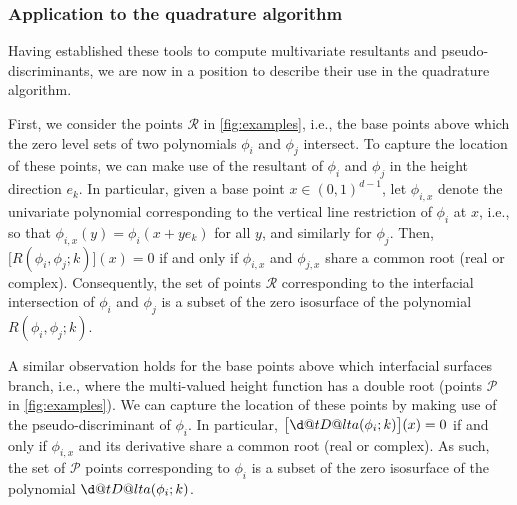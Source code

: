 \documentclass[onefignum,onetabnum,onealgnum,oneeqnum]{siamart190516}
\makeatletter
\newcommand{\dotDelta}{{\vphantom{\Delta}\mathpalette\d@tD@lta\relax}}
\newcommand{\d@tD@lta}[2]{\ooalign{\hidewidth$\m@th#1\mkern-1mu\cdot$\hidewidth\cr$\m@th#1\Delta$\cr}}
\makeatother
\begin{document}







\subsubsection{Application to the quadrature algorithm} \label{sec:spurious} Having established these tools to compute multivariate resultants and pseudo-discriminants, we are now in a position to describe their use in the quadrature algorithm. 

First, we consider the points $\mathcal R$ in \cref{fig:examples}, i.e., the base points above which the zero level sets of two polynomials $\phi_i$ and $\phi_j$ intersect. To capture the location of these points, we can make use of the resultant of $\phi_i$ and $\phi_j$ in the height direction $e_k$. In particular, given a base point $x \in (0,1)^{d-1}$, let $\phi_{i,x}$ denote the univariate polynomial corresponding to the vertical line restriction of $\phi_i$ at $x$, i.e., so that $\phi_{i,x}(y) = \phi_i(x + y e_k)$ for all $y$, and similarly for $\phi_j$. Then, $\bigl[R(\phi_i, \phi_j; k)\bigr](x) = 0$ if and only if $\phi_{i,x}$ and $\phi_{j,x}$ share a common root (real or complex). Consequently, the set of points ${\mathcal R}$ corresponding to the interfacial intersection of $\phi_i$ and $\phi_j$ is a subset of the zero isosurface of the polynomial $R(\phi_i, \phi_j; k)$.

A similar observation holds for the base points above which interfacial surfaces branch, i.e., where the multi-valued height function has a double root (points $\mathcal P$ in \cref{fig:examples}). We can capture the location of these points by making use of the pseudo-discriminant of $\phi_i$. In particular, $\bigl[\dotDelta(\phi_i;k)\bigr](x) = 0$ if and only if $\phi_{i,x}$ and its derivative share a common root (real or complex). %
As such, the set of ${\mathcal P}$ points corresponding to $\phi_i$ is a subset of the zero isosurface of the polynomial $\dotDelta(\phi_i; k)$.
\end{document}
